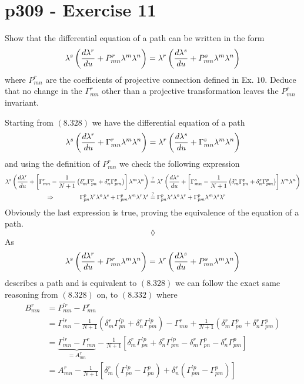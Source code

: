 \section{p309 - Exercise 11}
\begin{tcolorbox}
Show that the differential equation of a path can be written in the form
$$\lambda^s\left(\dv{\lambda^r}{u}+P^r_{mn}\lambda^m\lambda^n\right) = \lambda^r\left(\dv{\lambda^s}{u}+P^s_{mn}\lambda^m\lambda^n\right)$$
where $P^r_{mn}$ are the coefficients of projective connection defined in Ex. $10$. Deduce that no change in the $\Gamma^r_{mn}$ other than a projective transformation leaves the $P^r_{mn}$ invariant.
\end{tcolorbox}
Starting from $\mathbf{(8.328)}$ we have the differential equation of a path
\begin{align}
\lambda^s\left(\dv{\lambda^r}{u}+\Gamma^r_{mn}\lambda^m\lambda^n\right) = \lambda^r\left(\dv{\lambda^s}{u}+\Gamma^s_{mn}\lambda^m\lambda^n\right)
\end{align}
and using the definition of $P^r_{mn}$ we check the following expression
\begin{align}
\lambda^s\left(\dv{\lambda^r}{u}+\left[\Gamma^r_{mn}-\frac{1}{N+1}\left(\delta^r_m \Gamma^p_{pn}+  \delta^r_n \Gamma^p_{pm} \right)\right]\lambda^m\lambda^n\right) &\overset{\mathrm{?}}{=} \lambda^r\left(\dv{\lambda^s}{u}+\left[\Gamma^s_{mn}-\frac{1}{N+1}\left(\delta^s_m \Gamma^p_{pn}+  \delta^s_n \Gamma^p_{pm} \right)\right]\lambda^m\lambda^n\right)\\
\Rightarrow \quad\quad\quad\quad  \Gamma^p_{pn}\lambda^r\lambda^n\lambda^s+  \Gamma^p_{pm} \lambda^m\lambda^r\lambda^s &\overset{\mathrm{?}}{=} \Gamma^p_{pn}\lambda^s\lambda^n\lambda^r+   \Gamma^p_{pm}\lambda^m\lambda^s\lambda^r
\end{align}
Obviously the last expression is true, proving the equivalence of the equation of a path.
$$\lozenge$$
As $$\lambda^s\left(\dv{\lambda^r}{u}+P^r_{mn}\lambda^m\lambda^n\right) = \lambda^r\left(\dv{\lambda^s}{u}+P^s_{mn}\lambda^m\lambda^n\right)$$ describes a path and is equivalent to $\mathbf{(8.328)}$ we can follow the exact same reasoning from $\mathbf{(8.328)}$ on, to $\mathbf{(8.332)}$ where 
\begin{align}
B^r_{mn} &=P^{'r}_{mn}-P^{r}_{mn}\\
&=\Gamma ^{'r}_{mn}-\frac{1}{N+1}\left(\delta^r_m \Gamma^{'p}_{pn}+  \delta^r_n \Gamma^{'p}_{pm} \right)-\Gamma ^{r}_{mn}+\frac{1}{N+1}\left(\delta^r_m \Gamma^p_{pn}+  \delta^r_n \Gamma^p_{pm} \right)\\
&=\underbrace{\Gamma ^{'r}_{mn}-\Gamma ^{r}_{mn}}_{= A^r_{mn}}-\frac{1}{N+1}\left[\delta^r_m \Gamma^{'p}_{pn}+  \delta^r_n \Gamma^{'p}_{pm} -\delta^r_m \Gamma^p_{pn}-  \delta^r_n \Gamma^p_{pm} \right]\\
&=A^r_{mn}-\frac{1}{N+1}\left[\delta^r_m\left( \Gamma^{'p}_{pn}-\Gamma^p_{pn}\right) +  \delta^r_n \left(\Gamma^{'p}_{pm} -   \Gamma^p_{pm} \right)\right]
\end{align}
